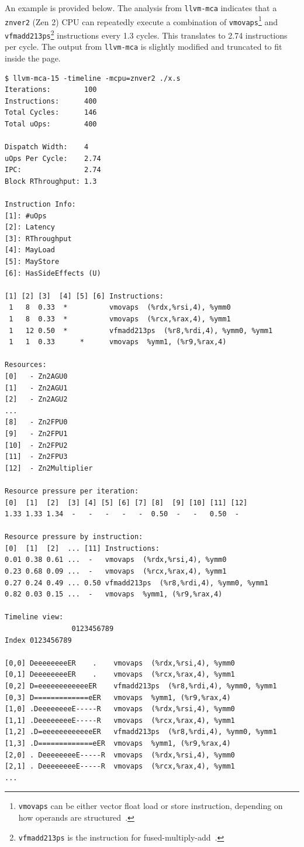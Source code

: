 \documentclass[logo,bsc,singlespacing,parskip]{infthesis}
\newcommand{\mca}{\texttt{llvm-mca}}
\begin{document}
An example is provided below. The analysis from \mca{} indicates that a
\texttt{znver2} (Zen 2) CPU can repeatedly execute a combination of
\texttt{vmovaps}\footnote{\texttt{vmovaps} can be either vector float load or
store instruction, depending on how operands are structured~\cite{instruction}.}
and \texttt{vfmadd213ps}\footnote{\texttt{vfmadd213ps} is the instruction for
fused-multiply-add~\cite{instruction}.} instructions every 1.3 cycles. This
translates to 2.74 instructions per cycle. The output from \mca{} is slightly
modified and truncated to fit inside the page.

\begin{verbatim}
$ llvm-mca-15 -timeline -mcpu=znver2 ./x.s 
Iterations:        100
Instructions:      400
Total Cycles:      146
Total uOps:        400

Dispatch Width:    4
uOps Per Cycle:    2.74
IPC:               2.74
Block RThroughput: 1.3

Instruction Info:
[1]: #uOps
[2]: Latency
[3]: RThroughput
[4]: MayLoad
[5]: MayStore
[6]: HasSideEffects (U)

[1] [2] [3]  [4] [5] [6] Instructions:
 1   8  0.33  *          vmovaps  (%rdx,%rsi,4), %ymm0
 1   8  0.33  *          vmovaps  (%rcx,%rax,4), %ymm1
 1   12 0.50  *          vfmadd213ps  (%r8,%rdi,4), %ymm0, %ymm1
 1   1  0.33      *      vmovaps  %ymm1, (%r9,%rax,4)

Resources:
[0]   - Zn2AGU0
[1]   - Zn2AGU1
[2]   - Zn2AGU2
...
[8]   - Zn2FPU0
[9]   - Zn2FPU1
[10]  - Zn2FPU2
[11]  - Zn2FPU3
[12]  - Zn2Multiplier

Resource pressure per iteration:
[0]  [1]  [2]  [3] [4] [5] [6] [7] [8]  [9] [10] [11] [12]   
1.33 1.33 1.34  -   -   -   -   -  0.50  -   -   0.50  -     

Resource pressure by instruction:
[0]  [1]  [2]  ... [11] Instructions:
0.01 0.38 0.61 ...  -   vmovaps  (%rdx,%rsi,4), %ymm0
0.23 0.68 0.09 ...  -   vmovaps  (%rcx,%rax,4), %ymm1
0.27 0.24 0.49 ... 0.50 vfmadd213ps  (%r8,%rdi,4), %ymm0, %ymm1
0.82 0.03 0.15 ...  -   vmovaps  %ymm1, (%r9,%rax,4)

Timeline view:
                0123456789      
Index 0123456789           

[0,0] DeeeeeeeeER    .    vmovaps  (%rdx,%rsi,4), %ymm0
[0,1] DeeeeeeeeER    .    vmovaps  (%rcx,%rax,4), %ymm1
[0,2] D=eeeeeeeeeeeeER    vfmadd213ps  (%r8,%rdi,4), %ymm0, %ymm1
[0,3] D=============eER   vmovaps  %ymm1, (%r9,%rax,4)
[1,0] .DeeeeeeeeE-----R   vmovaps  (%rdx,%rsi,4), %ymm0
[1,1] .DeeeeeeeeE-----R   vmovaps  (%rcx,%rax,4), %ymm1
[1,2] .D=eeeeeeeeeeeeER   vfmadd213ps  (%r8,%rdi,4), %ymm0, %ymm1
[1,3] .D=============eER  vmovaps  %ymm1, (%r9,%rax,4)
[2,0] . DeeeeeeeeE-----R  vmovaps  (%rdx,%rsi,4), %ymm0
[2,1] . DeeeeeeeeE-----R  vmovaps  (%rcx,%rax,4), %ymm1
...

\end{verbatim}
\end{document}
